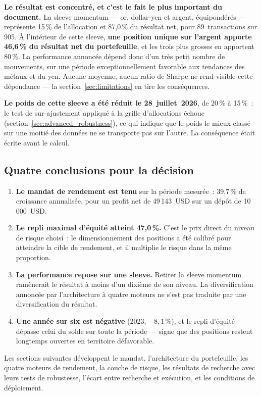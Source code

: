 \begin{insightbox}
\textbf{Le résultat est concentré, et c'est le fait le plus important du document.} La sleeve momentum --- or, dollar-yen et argent, équipondérés --- représente 15\,\% de l'allocation et 87,0\,\% du résultat net, pour 89~transactions sur 905. À l'intérieur de cette sleeve, \textbf{une position unique sur l'argent apporte 46,6\,\% du résultat net du portefeuille}, et les trois plus grosses en apportent 80\,\%. La performance annoncée dépend donc d'un très petit nombre de mouvements, sur une période exceptionnellement favorable aux tendances des métaux et du yen. Aucune moyenne, aucun ratio de Sharpe ne rend visible cette dépendance --- la section~\ref{sec:limitations} en tire les conséquences.

\textbf{Le poids de cette sleeve a été réduit le 28~juillet~2026}, de 20\,\% à 15\,\%~: le test de sur-ajustement appliqué à la grille d'allocations échoue (section~\ref{sec:advanced_robustness}), ce qui indique que le poids le mieux classé sur une moitié des données ne se transporte pas sur l'autre. La conséquence était écrite avant le calcul.
\end{insightbox}



\subsection*{Quatre conclusions pour la décision}

\begin{enumerate}
\item \textbf{Le mandat de rendement est tenu} sur la période mesurée~: 39,7\,\% de croissance annualisée, pour un profit net de 49\,143~USD sur un dépôt de 10\,000~USD.
\item \textbf{Le repli maximal d'équité atteint 47,0\,\%.} C'est le prix direct du niveau de risque choisi~: le dimensionnement des positions a été calibré pour atteindre la cible de rendement, et il multiplie le risque dans la même proportion.
\item \textbf{La performance repose sur une sleeve.} Retirer la sleeve momentum ramènerait le résultat à moins d'un dixième de son niveau. La diversification annoncée par l'architecture à quatre moteurs ne s'est pas traduite par une diversification du résultat.
\item \textbf{Une année sur six est négative} (2023, $-8{,}1$\,\%), et le repli d'équité dépasse celui du solde sur toute la période --- signe que des positions restent longtemps ouvertes en territoire défavorable.
\end{enumerate}



Les sections suivantes développent le mandat, l'architecture du portefeuille, les quatre moteurs de rendement, la couche de risque, les résultats de recherche avec leurs tests de robustesse, l'écart entre recherche et exécution, et les conditions de déploiement.
